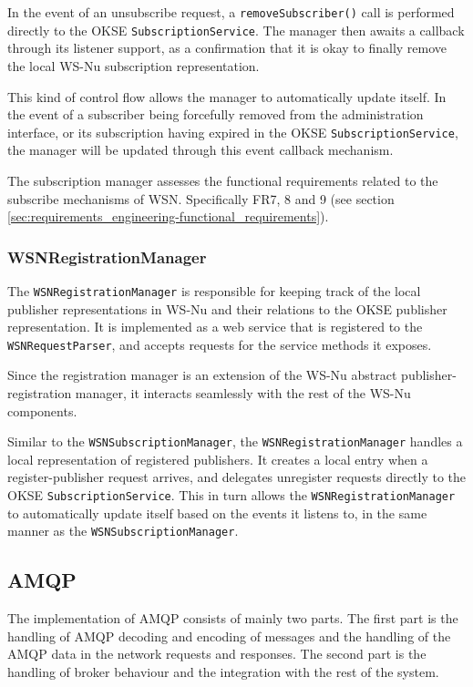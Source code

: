In the event of an unsubscribe request, a \verb!removeSubscriber()! call is performed directly to the OKSE \verb!SubscriptionService!. The manager then awaits a callback through its listener support, as a confirmation that it is okay to finally remove the local WS-Nu subscription representation.

This kind of control flow allows the manager to automatically update itself. In the event of a subscriber being forcefully removed from the administration interface, or its subscription having expired in the OKSE \verb!SubscriptionService!, the manager will be updated through this event callback mechanism.

The subscription manager assesses the functional requirements related to the subscribe mechanisms of WSN. Specifically FR7, 8 and 9 (see section \ref{sec:requirements_engineering-functional_requirements}).

\subsubsection{WSNRegistrationManager}

The \verb!WSNRegistrationManager! is responsible for keeping track of the local publisher representations in WS-Nu and their relations to the OKSE publisher representation. It is implemented as a web service that is registered to the \verb!WSNRequestParser!, and accepts requests for the service methods it exposes.

Since the registration manager is an extension of the WS-Nu abstract publisher-registration manager, it interacts seamlessly with the rest of the WS-Nu components.

Similar to the \verb!WSNSubscriptionManager!, the \verb!WSNRegistrationManager! handles a local representation of registered publishers. It creates a local entry when a register-publisher request arrives, and delegates unregister requests directly to the OKSE \verb!SubscriptionService!. This in turn allows the \verb!WSNRegistrationManager! to automatically update itself based on the events it listens to, in the same manner as the \verb!WSNSubscriptionManager!.

\subsection{AMQP}
\label{subsec:architecture_and_implementation-implementation-amqp}
The implementation of AMQP consists of mainly two parts. The first part is the handling of AMQP decoding and encoding of messages and the handling of the AMQP data in the network requests and responses. The second part is the handling of broker behaviour and the integration with the rest of the system. 

